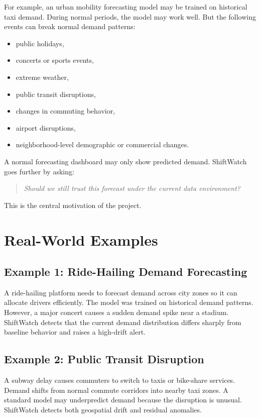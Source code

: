 \documentclass[11pt]{article}
\begin{document}
For example, an urban mobility forecasting model may be trained on historical taxi demand. During normal periods, the model may work well. But the following events can break normal demand patterns:

\begin{itemize}
    \item public holidays,
    \item concerts or sports events,
    \item extreme weather,
    \item public transit disruptions,
    \item changes in commuting behavior,
    \item airport disruptions,
    \item neighborhood-level demographic or commercial changes.
\end{itemize}

A normal forecasting dashboard may only show predicted demand. ShiftWatch goes further by asking:

\begin{quote}
    \textit{Should we still trust this forecast under the current data environment?}
\end{quote}

This is the central motivation of the project.

\section{Real-World Examples}

\subsection{Example 1: Ride-Hailing Demand Forecasting}

A ride-hailing platform needs to forecast demand across city zones so it can allocate drivers efficiently. The model was trained on historical demand patterns. However, a major concert causes a sudden demand spike near a stadium. ShiftWatch detects that the current demand distribution differs sharply from baseline behavior and raises a high-drift alert.

\subsection{Example 2: Public Transit Disruption}

A subway delay causes commuters to switch to taxis or bike-share services. Demand shifts from normal commute corridors into nearby taxi zones. A standard model may underpredict demand because the disruption is unusual. ShiftWatch detects both geospatial drift and residual anomalies.
\end{document}
